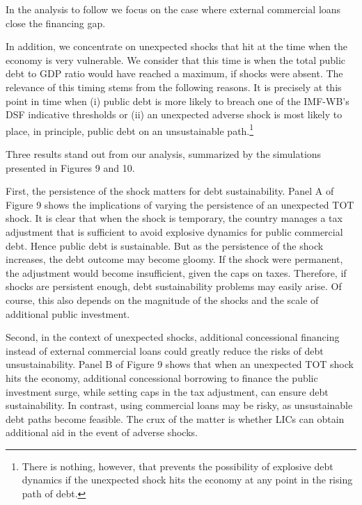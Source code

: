 \documentclass[11pt]{article}
\begin{document}

In the analysis to follow we focus on the case where external commercial
loans close the financing gap.

In addition, we concentrate on unexpected shocks that hit at the time when
the economy is very vulnerable. We consider that this time is when the total
public debt to GDP ratio would have reached a maximum, if shocks were
absent. The relevance of this timing stems from the following reasons. It is
precisely at this point in time when (i) public debt is more likely to
breach one of the IMF-WB's DSF indicative thresholds or (ii) an unexpected
adverse shock is most likely to place, in principle, public debt on an
unsustainable path.\footnote{%
There is nothing, however, that prevents the possibility of explosive debt
dynamics if the unexpected shock hits the economy at any point in the rising
path of debt.}

Three results stand out from our analysis, summarized by the simulations
presented in Figures 9 and 10.

First, the persistence of the shock matters for debt sustainability. Panel A
of Figure 9 shows the implications of varying the persistence of an
unexpected TOT shock. It is clear that when the shock is temporary, the
country manages a tax adjustment that is sufficient to avoid explosive
dynamics for public commercial debt. Hence public debt is sustainable. But
as the persistence of the shock increases, the debt outcome may become
gloomy. If the shock were permanent, the adjustment would become
insufficient, given the caps on taxes. Therefore, if shocks are persistent
enough, debt sustainability problems may easily arise. Of course, this also
depends on the magnitude of the shocks and the scale of additional public
investment.

Second, in the context of unexpected shocks, additional concessional
financing instead of external commercial loans could greatly reduce the
risks of debt unsustainability. Panel B of Figure 9 shows that when an
unexpected TOT shock hits the economy, additional concessional borrowing to
finance the public investment surge, while setting caps in the tax
adjustment, can ensure debt sustainability. In contrast, using commercial
loans may be risky, as unsustainable debt paths become feasible. The crux of
the matter is whether LICs can obtain additional aid in the event of adverse
shocks.
\end{document}
